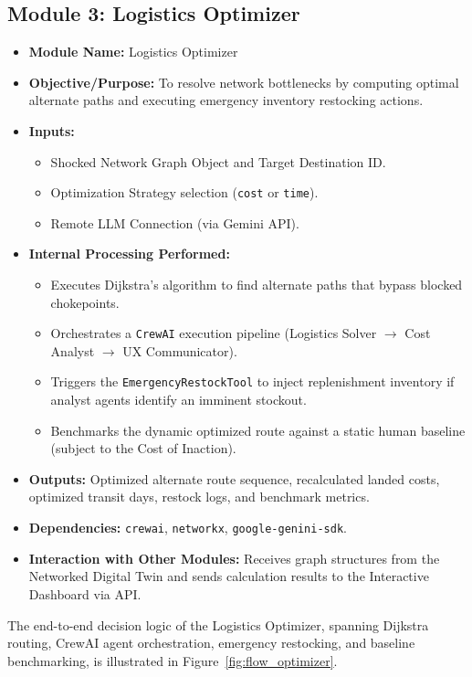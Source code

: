 \subsection[Module 3: Logistics Optimizer]{Module 3: Logistics Optimizer}
\begin{itemize}
    \item \textbf{Module Name:} Logistics Optimizer
    \item \textbf{Objective/Purpose:} To resolve network bottlenecks by computing optimal alternate paths and executing emergency inventory restocking actions.
    \item \textbf{Inputs:}
    \begin{itemize}
        \item Shocked Network Graph Object and Target Destination ID.
        \item Optimization Strategy selection (\texttt{cost} or \texttt{time}).
        \item Remote LLM Connection (via Gemini API).
    \end{itemize}
    \item \textbf{Internal Processing Performed:}
    \begin{itemize}
        \item Executes Dijkstra's algorithm to find alternate paths that bypass blocked chokepoints.
        \item Orchestrates a \texttt{CrewAI} execution pipeline (Logistics Solver $\rightarrow$ Cost Analyst $\rightarrow$ UX Communicator).
        \item Triggers the \texttt{EmergencyRestockTool} to inject replenishment inventory if analyst agents identify an imminent stockout.
        \item Benchmarks the dynamic optimized route against a static human baseline (subject to the Cost of Inaction).
    \end{itemize}
    \item \textbf{Outputs:} Optimized alternate route sequence, recalculated landed costs, optimized transit days, restock logs, and benchmark metrics.
    \item \textbf{Dependencies:} \texttt{crewai}, \texttt{networkx}, \texttt{google-genini-sdk}.
    \item \textbf{Interaction with Other Modules:} Receives graph structures from the Networked Digital Twin and sends calculation results to the Interactive Dashboard via API.
\end{itemize}
The end-to-end decision logic of the Logistics Optimizer, spanning Dijkstra routing, CrewAI agent orchestration, emergency restocking, and baseline benchmarking, is illustrated in Figure~\ref{fig:flow_optimizer}.

